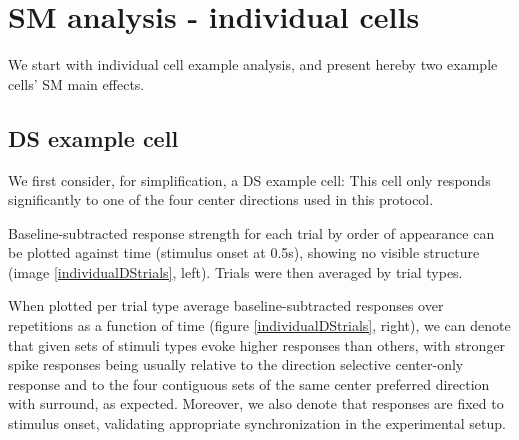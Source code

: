 \section{SM analysis - individual cells}

We start with individual cell example analysis, and present hereby two example cells' SM main effects.

\subsection{DS example cell}
\label{DSexamplecell}

We first consider, for simplification, a DS example cell: This cell only responds significantly to one of the four center directions used in this protocol.

Baseline-subtracted response strength for each trial by order of appearance can be plotted against time (stimulus onset at 0.5s), showing no visible structure (image \ref{individualDStrials}, left). 
Trials were then averaged by trial types.

When plotted per trial type average baseline-subtracted responses over repetitions as a function of time (figure \ref{individualDStrials}, right), we can denote that given sets of stimuli types evoke higher responses than others, with stronger spike responses being usually relative to the direction selective center-only response and to the four contiguous sets of the same center preferred direction with surround, as expected. Moreover, we also denote that responses are fixed to stimulus onset, validating appropriate synchronization in the experimental setup.

